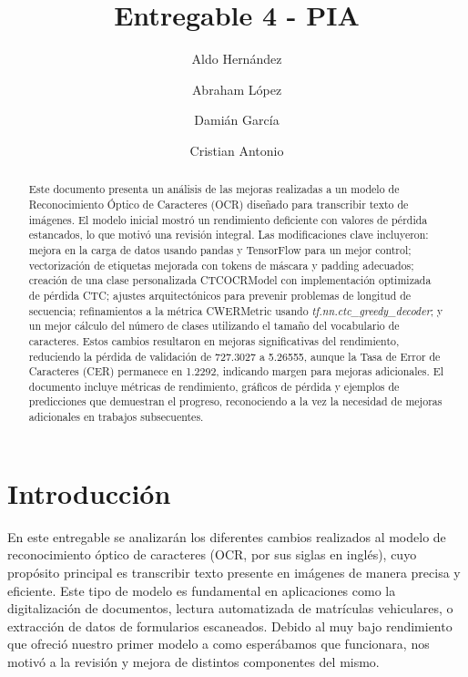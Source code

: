 \documentclass[10pt]{article}
\begin{document}
	\begin{opening}
		\title{Entregable 4 - PIA}
		\author[Universidad Autónoma de Nuevo León, San Nicolás de los Garza, aldo.hernandezt@uanl.edu.mx]{Aldo Hernández}
		\author[Universidad Autónoma de Nuevo León, San Nicolás de los Garza, abraham.lopezg@uanl.edu.mx]{Abraham López}
		\author[Universidad Autónoma de Nuevo León, San Nicolás de los Garza, gilberto.garciam@uanl.edu.mx]{Damián García}
		\author[Universidad Autónoma de Nuevo León, San Nicolás de los Garza, cristian.antoniosnt@uanl.edu.mx]{Cristian Antonio}
		
		\begin{abstract}			
			Este documento presenta un análisis de las mejoras realizadas a un modelo de Reconocimiento Óptico de Caracteres (OCR) diseñado para transcribir texto de imágenes. El modelo inicial mostró un rendimiento deficiente con valores de pérdida estancados, lo que motivó una revisión integral. Las modificaciones clave incluyeron: mejora en la carga de datos usando pandas y TensorFlow para un mejor control; vectorización de etiquetas mejorada con tokens de máscara y padding adecuados; creación de una clase personalizada CTCOCRModel con implementación optimizada de pérdida CTC; ajustes arquitectónicos para prevenir problemas de longitud de secuencia; refinamientos a la métrica CWERMetric usando \textit{tf.nn.ctc\_greedy\_decoder}; y un mejor cálculo del número de clases utilizando el tamaño del vocabulario de caracteres. Estos cambios resultaron en mejoras significativas del rendimiento, reduciendo la pérdida de validación de 727.3027 a 5.26555, aunque la Tasa de Error de Caracteres (CER) permanece en 1.2292, indicando margen para mejoras adicionales. El documento incluye métricas de rendimiento, gráficos de pérdida y ejemplos de predicciones que demuestran el progreso, reconociendo a la vez la necesidad de mejoras adicionales en trabajos subsecuentes.
		\end{abstract}
		
	\end{opening}
	
	\section{Introducción}
	En este entregable se analizarán los diferentes cambios realizados al modelo de reconocimiento óptico de caracteres (OCR, por sus siglas en inglés), cuyo propósito principal es transcribir texto presente en imágenes de manera precisa y eficiente. Este tipo de modelo es fundamental en aplicaciones como la digitalización de documentos, lectura automatizada de matrículas vehiculares, o extracción de datos de formularios escaneados. Debido al muy bajo rendimiento que ofreció nuestro primer modelo a como esperábamos que funcionara, nos motivó a la revisión y mejora de distintos componentes del mismo.
	
\end{document}
